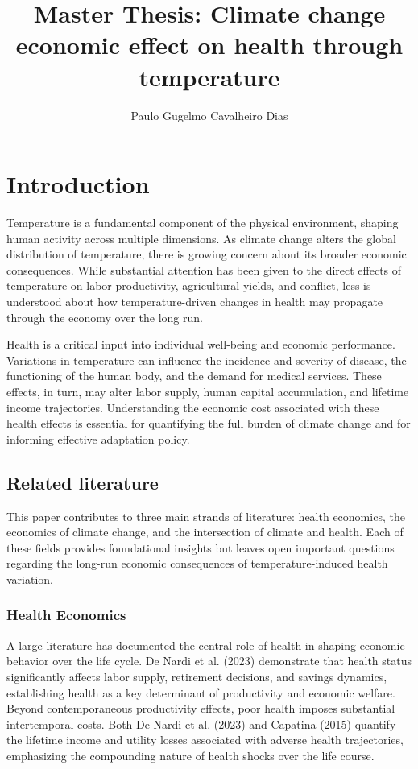 \documentclass{article}
\author{Paulo Gugelmo Cavalheiro Dias}
\title{Master Thesis: Climate change economic effect on health through temperature}
\begin{document}
\maketitle

\newpage
\tableofcontents

\newpage
\section{Introduction}
Temperature is a fundamental component of the
physical environment, shaping human activity
across multiple dimensions. As climate change
alters the global distribution of temperature,
there is growing concern about its broader
economic consequences. While substantial
attention has been given to the direct effects
of temperature on labor productivity,
agricultural yields, and conflict, less
is understood about how temperature-driven
changes in health may propagate through the
economy over the long run.

Health is a critical input into individual
well-being and economic performance.
Variations in temperature can influence
the incidence and severity of disease,
the functioning of the human body, and
the demand for medical services. These
effects, in turn, may alter labor supply,
human capital accumulation, and lifetime
income trajectories. Understanding the
economic cost associated with these health
effects is essential for quantifying the
full burden of climate change and for
informing effective adaptation policy.

\subsection{Related literature}

This paper contributes to three main strands of literature: health economics, the economics of climate change, and the intersection of climate and health. Each of these fields provides foundational insights but leaves open important questions regarding the long-run economic consequences of temperature-induced health variation.

\subsubsection{Health Economics}

A large literature has documented the central role of health
in shaping economic behavior over the life cycle.
De Nardi et al. (2023) demonstrate that health status
significantly affects labor supply, retirement decisions,
and savings dynamics, establishing health as a key determinant
of productivity and economic welfare.
Beyond contemporaneous productivity effects,
poor health imposes substantial intertemporal costs.
Both De Nardi et al. (2023) and Capatina (2015) quantify
the lifetime income and utility losses associated with
adverse health trajectories, emphasizing the compounding
nature of health shocks over the life course.
\end{document}

